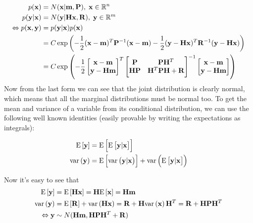 \documentclass[a4paper,oneside,article]{memoir}
\begin{document}
\begin{align}
	p(\v{x})&=N(\v{x}|\v{m},\v{P}),\;\v{x}\in\R^n\\
	p(\v{y}|\v{x})&=N(\v{y}|\v{H}\v{x},\v{R}),\;\v{y}\in\R^m\\
	\Leftrightarrow p(\v{x},\v{y})&=p(\v{y}|\v{x})p(\v{x})\\
	&=C\exp\left(-\frac{1}{2}(\v{x}-\v{m})^T\v{P}^{-1}(\v{x}-\v{m})-\frac{1}{2}(\v{y}-\v{H}\v{x})^T\v{R}^{-1}(\v{y}-\v{H}\v{x})\right)\\
	&=C\exp\left(-\frac{1}{2}
	\begin{bmatrix}
		\v{x}-\v{m}\\
		\v{y}-\v{H}\v{m}
	\end{bmatrix}^T
	\begin{bmatrix}
		\v{P}&\v{P}\v{H}^T\\
		\v{H}\v{P}&\v{H}^T\v{P}\v{H}+\v{R}
	\end{bmatrix}^{-1}
	\begin{bmatrix}
		\v{x}-\v{m}\\
		\v{y}-\v{H}\v{m}
	\end{bmatrix}
	\right)
\end{align}
Now from the last form we can see that the joint distribution is clearly normal, which means that
all the marginal distributions must be normal too. To get the mean and variance of a 
variable from its conditional distribution, we can use the following
well known identities (easily provable by writing the expectations as integrals):

\begin{align}
	\E{\v{y}}&=\E{\E{\v{y}|\v{x}}}\\
	\var{\v{y}}&=\E{\var{\v{y}|\v{x}}}+\var{\E{\v{y}|\v{x}}}
\end{align}

Now it's easy to see that
\begin{align}
	\E{\v{y}}&=\E{\v{H}\v{x}}=\v{H}\E{\v{x}}=\v{H}\v{m}\\
	\var{\v{y}}&=\E{\v{R}}+\var{\v{H}\v{x}}=\v{R}+\v{H}\var{\v{x}}\v{H}^T=\v{R}+\v{H}\v{P}\v{H}^T\\
	\Leftrightarrow \v{y} &\sim N(\v{H}\v{m},\v{H}\v{P}\v{H}^T+\v{R})
\end{align}

\subsubsection{}
\end{document}
